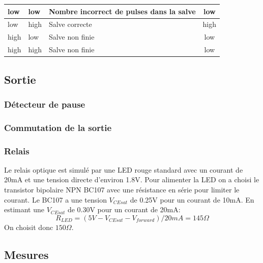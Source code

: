 \documentclass[french]{layout/Report}
\begin{document}
\begin{center}
    \begin{tabular}{| m{4cm} | m{4cm} | l | c |}
        \hline
        low     & low       & Nombre incorrect de pulses dans la salve & low \\ \hline
        low     & high  & Salve correcte    & high\\ \hline
        high    & low       & Salve non finie & low \\ \hline
        high    & high  & Salve non finie & low \\ \hline
    \end{tabular}
\end{center}

\subsection{Sortie}

\subsubsection{Détecteur de pause}

\subsubsection{Commutation de la sortie}
\subsubsection{Relais}
Le relais optique est simulé par une LED rouge standard avec un courant de 20mA et une tension directe d'environ 1.8V.
Pour alimenter la LED on a choisi le transistor bipolaire NPN BC107 avec une résistance en série pour limiter le courant.
Le BC107 a une tension \(V_{CEsat}\) de 0.25V pour un courant de 10mA.
En estimant une \(V_{CEsat}\) de 0.30V pour un courant de 20mA:
\[
R_{LED} = (5V - V_{CEsat} - V_{forward})/20mA = 145\Omega
\]
On choisit donc \(150\Omega\).

\subsection{Mesures}
\end{document}
